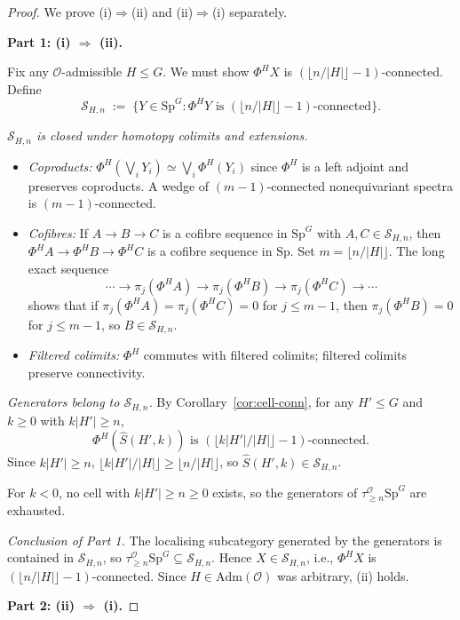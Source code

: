 \documentclass[12pt]{article}
\theoremstyle{definition}
\newcommand{\SpG}{\mathrm{Sp}^{G}}
\newcommand{\Spec}{\mathrm{Sp}}
\newcommand{\PhiH}{\Phi^{H}}
\newcommand{\OO}{\mathcal{O}}
\newcommand{\admis}{\mathrm{Adm}}
\begin{document}
\begin{proof}
We prove (i)$\Rightarrow$(ii) and (ii)$\Rightarrow$(i) separately.

\medskip
\noindent\textbf{Part 1: (i) $\Rightarrow$ (ii).}

Fix any $\OO$-admissible $H\leq G$. We must show $\PhiH X$ is
$(\lfloor n/|H|\rfloor-1)$-connected. Define
\[
\mathcal{S}_{H,n}\;:=\;\bigl\{Y\in\SpG:\PhiH Y\text{ is }(\lfloor n/|H|\rfloor-1)\text{-connected}\bigr\}.
\]

\emph{$\mathcal{S}_{H,n}$ is closed under homotopy colimits and extensions.}
\begin{itemize}
\item \emph{Coproducts:} $\PhiH(\bigvee_{i}Y_{i})\simeq\bigvee_{i}\PhiH(Y_{i})$
since $\PhiH$ is a left adjoint and preserves coproducts. A wedge of
$(m-1)$-connected nonequivariant spectra is $(m-1)$-connected.
\item \emph{Cofibres:} If $A\to B\to C$ is a cofibre sequence in $\SpG$ with
$A,C\in\mathcal{S}_{H,n}$, then $\PhiH A\to\PhiH B\to\PhiH C$ is a cofibre
sequence in $\Spec$. Set $m=\lfloor n/|H|\rfloor$. The long exact sequence
\[
\cdots\to\pi_{j}(\PhiH A)\to\pi_{j}(\PhiH B)\to\pi_{j}(\PhiH C)\to\cdots
\]
shows that if $\pi_{j}(\PhiH A)=\pi_{j}(\PhiH C)=0$ for $j\leq m-1$, then
$\pi_{j}(\PhiH B)=0$ for $j\leq m-1$, so $B\in\mathcal{S}_{H,n}$.
\item \emph{Filtered colimits:} $\PhiH$ commutes with filtered colimits;
filtered colimits preserve connectivity.
\end{itemize}

\emph{Generators belong to $\mathcal{S}_{H,n}$.}
By Corollary~\ref{cor:cell-conn}, for any $H'\leq G$ and $k\geq 0$ with
$k|H'|\geq n$,
\[
\PhiH(\widehat{S}(H',k))\text{ is }(\lfloor k|H'|/|H|\rfloor-1)\text{-connected.}
\]
Since $k|H'|\geq n$,
$\lfloor k|H'|/|H|\rfloor\geq\lfloor n/|H|\rfloor$,
so $\widehat{S}(H',k)\in\mathcal{S}_{H,n}$.

For $k<0$, no cell with $k|H'|\geq n\geq 0$ exists, so the generators of
$\tau_{\geq n}^{\OO}\SpG$ are exhausted.

\emph{Conclusion of Part 1.} The localising subcategory generated by the
generators is contained in $\mathcal{S}_{H,n}$, so $\tau_{\geq
n}^{\OO}\SpG\subseteq\mathcal{S}_{H,n}$. Hence
$X\in\mathcal{S}_{H,n}$, i.e., $\PhiH X$ is
$(\lfloor n/|H|\rfloor-1)$-connected. Since $H\in\admis(\OO)$ was arbitrary,
(ii) holds.

\medskip
\noindent\textbf{Part 2: (ii) $\Rightarrow$ (i).}


\end{proof}
\end{document}
